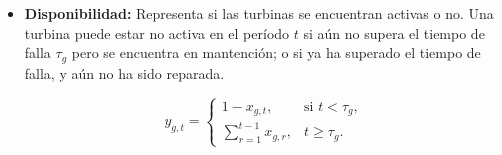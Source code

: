 \begin{itemize}
    \item \textbf{Disponibilidad:} Representa si las turbinas se encuentran activas o no. Una turbina
    puede estar no activa en el período $t$ si aún no supera el tiempo de falla $\tau_g$ pero se
    encuentra en mantención; o si ya ha superado el tiempo de falla, y aún no ha sido
    reparada.

    \begin{equation}
        y_{g,t} =
        \begin{cases}
            1 - x_{g,t}, & \text{si } t < \tau_g, \\[4pt]
            \displaystyle \sum_{r=1}^{t-1} x_{g,r}, & t \geq \tau_g.
        \end{cases}
    \end{equation}

\end{itemize}